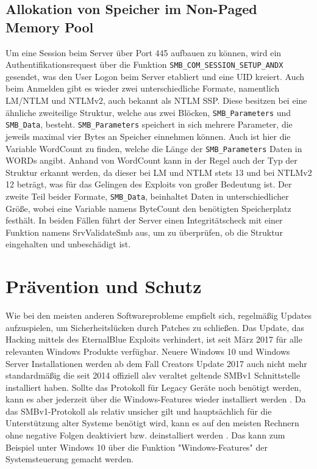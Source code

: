 \documentclass[DIV=12,headings=normal,pdftex,headinclude=false,footinclude=false,final]{scrreprt}
\begin{document}
\section{Allokation von Speicher im Non-Paged Memory Pool}
Um eine Session beim Server über Port 445 aufbauen zu können, wird ein Authentifikationsrequest über die Funktion \verb|SMB_COM_SESSION_SETUP_ANDX| gesendet, was den User Logon beim Server etabliert und eine UID kreiert. Auch beim Anmelden gibt es wieder zwei unterschiedliche Formate, namentlich LM/NTLM und NTLMv2, auch bekannt als NTLM SSP. Diese besitzen bei eine ähnliche zweiteilige Struktur, welche aus zwei Blöcken, \verb|SMB_Parameters| und \verb|SMB_Data|, besteht.
\verb|SMB_Parameters| speichert in sich mehrere Parameter, die jeweils maximal vier Bytes an Speicher einnehmen können. Auch ist hier die Variable WordCount zu finden, welche die Länge der \verb|SMB_Parameters| Daten in WORDs angibt. Anhand von WordCount kann in der Regel auch der Typ der Struktur erkannt werden, da dieser bei LM und NTLM stets 13 und bei NTLMv2 12 beträgt, was für das Gelingen des Exploits von großer Bedeutung ist.
Der zweite Teil beider Formate, \verb|SMB_Data|, beinhaltet Daten in unterschiedlicher Größe, wobei eine Variable namens ByteCount den benötigten Speicherplatz festhält. In beiden Fällen führt der Server einen Integritätscheck mit einer Funktion namens SrvValidateSmb aus, um zu überprüfen, ob die Struktur eingehalten und unbeschädigt ist.

\chapter{Prävention und Schutz}
Wie bei den meisten anderen Softwareprobleme empfielt sich, regelmäßig Updates aufzuspielen, um Sicherheitslücken durch Patches zu schließen. Das Update, das Hacking mittels des EternalBlue Exploits verhindert, ist seit März 2017 für alle relevanten Windows Produkte verfügbar.
Neuere Windows 10 und Windows Server Installationen werden ab dem Fall Creators Update 2017 auch nicht mehr standardmäßig die seit 2014 offiziell alsv veraltet geltende SMBv1 Schnittstelle installiert haben. Sollte das Protokoll für Legacy Geräte noch benötigt werden, kann es aber jederzeit über die Windows-Features wieder installiert werden \cite{MS:Fix}.
Da das SMBv1-Protokoll als relativ unsicher gilt und hauptsächlich für die Unterstützung alter Systeme benötigt wird, kann es auf den meisten Rechnern ohne negative Folgen deaktiviert bzw. deinstalliert werden \cite{WP}. Das kann zum Beispiel unter Windows 10 über die Funktion "Windows-Features" der Systemsteuerung gemacht werden.

\clearpage
\label{sec:literatur}
\renewcommand{\bibname}{Quellenverzeichnis}


\end{document}
